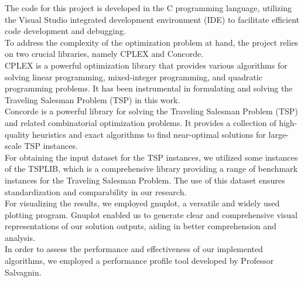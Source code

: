 The code for this project is developed in the C programming language, utilizing the Visual Studio integrated development environment (IDE) to facilitate efficient code development and debugging.
\\To address the complexity of the optimization problem at hand, the project relies on two crucial libraries, namely CPLEX and Concorde. \\CPLEX is a powerful optimization library that provides various algorithms for solving linear programming, mixed-integer programming, and quadratic programming problems. It has been instrumental in formulating and solving the Traveling Salesman Problem (TSP) in this work.
\\
Concorde is a powerful library for solving the Traveling Salesman Problem (TSP) and related combinatorial optimization problems. It provides a collection of high-quality heuristics and exact algorithms to find near-optimal solutions for large-scale TSP instances. 
\\
For obtaining the input dataset for the TSP instances, we utilized some instances of the TSPLIB, which is a comprehensive library providing a range of benchmark instances for the Traveling Salesman Problem. The use of this dataset ensures standardization and comparability in our research.
\\
For visualizing the results, we employed gnuplot, a versatile and widely used plotting program. Gnuplot enabled us to generate clear and comprehensive visual representations of our solution outputs, aiding in better comprehension and analysis.
\\
In order to assess the performance and effectiveness of our implemented algorithms, we employed a performance profile tool developed by Professor Salvagnin.
